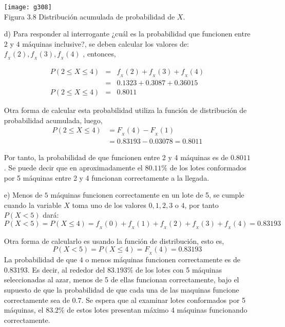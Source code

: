 \documentclass[base=hide,12pt]{elegantbook}
\begin{document}
\begin{itemize}
		\begin{center}
			\texttt{[image: g308]} \\
			Figura 3.8 Distribución acumulada de probabilidad de $X$.
			\label{fig:38}
		\end{center}

\vspace{1cm}		
\item[d)] Para responder al interrogante ¿cuál es la probabilidad que funcionen entre $2$ y $4$ máquinas inclusive?, se deben calcular los valores de: $f_{_{X}}(2),f_{_{X}}(3),f_{_{X}}(4)$ , entonces,

	\begin{eqnarray*}
		P(2\leq X\leq4)&=&f_{_{X}}(2)+f_{_{X}}(3)+f_{_{X}}(4)\\
		&=&0.1323+0.3087+0.36015\\
		P(2\leq X\leq4)&=&0.8011
	\end{eqnarray*}
	
	Otra forma de calcular esta probabilidad utiliza la función de distribución de probabilidad acumulada, luego,
	\begin{equation*}
		\begin{split}
			P(2\leq X\leq4)&=F_{_{X}}(4)-F_{_{X}}(1)\\
			&=0.83193-0.03078=0.8011
		\end{split}
	\end{equation*}
			
	Por tanto, la probabilidad de que funcionen entre 2 y 4 máquinas es de $0.8011$. Se puede decir que en aproximadamente el $80.11\%$ de los lotes conformados por 5 máquinas entre 2 y 4 funcionan correctamente a la llegada. \\
	\item[e)] Menos de $5$ máquinas funcionen correctamente en un lote de 5, 
	se cumple cuando la variable $X$ toma uno de los valores $0,1,2,3$ o $4$, por tanto $P(X<5)$ dará:
	$$ P(X<5)=P(X\leq4)=f_{_{X}}(0)+f_{_{X}}(1)+f_{_{X}}(2)+f_{_{X}}(3)+f_{_{X}}(4)=0.83193 $$
	
	Otra forma de calcularlo es usando la función de distribución, esto es,
	$$P(X<5)=P(X\leq4)=F_{_{X}}(4)=0.83193$$
	La probabilidad de que  $4$ o menos máquinas funcionen correctamente es de $0.83193$. Es decir, al rededor del $83.193\%$ de los lotes con 5 máquinas seleccionadas al azar,  menos de 5 de ellas funcionan correctamente, bajo el supuesto de que la probabilidad de que cada una de las maquinas funcione correctamente sea de $0.7$. Se espera que al examinar lotes conformados por 5 máquinas, el 83.2\% de estos lotes presentan máximo 4 máquinas funcionando correctamente.
	

\end{itemize}
\end{document}
